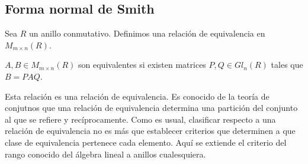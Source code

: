 \subsection{Forma normal de Smith}

Sea $R$ un anillo conmutativo. Definimos una relación de equivalencia en $M_{m \times n}(R)$.

\begin{definition}
$A,B \in M_{m \times n}(R)$ son equivalentes si existen matrices $P,Q \in Gl_n(R)$ tales que $B = PAQ$. 
\end{definition}

Esta relación es una relación de equivalencia. Es conocido de la teoría de conjutnos que una relación de equivalencia determina una partición del conjunto al que se refiere y recíprocamente. Como es usual, clasificar respecto a una relación de equivalencia no es más que establecer criterios que determinen a que clase de equivalencia pertenece cada elemento. Aquí se extiende el criterio del rango conocido del álgebra lineal a anillos cualesquiera.

